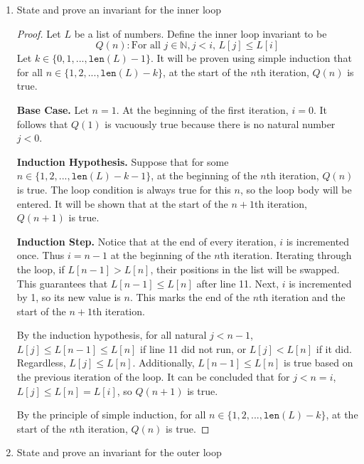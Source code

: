 \documentclass[11pt]{article}
\begin{document}
    \begin{enumerate}[label=(\alph*)]
        \item State and prove an invariant for the inner loop
        
        \begin{proof}
            Let \(L\) be a list of numbers. Define the inner loop invariant to be
            \[
                Q(n): \text{For all } j \in \mathbb{N}, j < i \text{, } L[j] \leq L[i]
            \]
            Let \(k \in \{0,1,..., \texttt{len}(L) - 1\}\). It will be proven using simple induction that for all \(n \in \{1, 2, ..., \texttt{len}(L) - k\}\), at the start of the \(n\)th iteration, \(Q(n)\) is true.

            \textbf{Base Case.} Let \(n=1\). At the beginning of the first iteration, \(i = 0\). It follows that \(Q(1)\) is vacuously true because there is no natural number \(j < 0\).

            \textbf{Induction Hypothesis.} Suppose that for some \(n \in \{1, 2,..., \texttt{len}(L)-k-1\}\), at the beginning of the \(n\)th iteration, \(Q(n)\) is true. The loop condition is always true for this \(n\), so the loop body will be entered. It will be shown that at the start of the \(n+1\)th iteration, \(Q(n+1)\) is true.

            \textbf{Induction Step.} Notice that at the end of every iteration, \(i\) is incremented once. Thus \(i = n - 1\) at the beginning of the \(n\)th iteration. Iterating through the loop, if \(L[n-1] > L[n]\), their positions in the list will be swapped. This guarantees that \(L[n-1] \leq L[n]\) after line 11. Next, \(i\) is incremented by 1, so its new value is \(n\). This marks the end of the \(n\)th iteration and the start of the \(n+1\)th iteration.

            By the induction hypothesis, for all natural \(j < n-1\), \(L[j] \leq L[n-1] \leq L[n]\) if line 11 did not run, or \(L[j] < L[n]\) if it did. Regardless, \(L[j] \leq L[n]\). Additionally, \(L[n-1] \leq L[n]\) is true based on the previous iteration of the loop. It can be concluded that for \(j < n = i\), \(L[j] \leq L[n] = L[i]\), so \(Q(n+1)\) is true.

            By the principle of simple induction, for all \(n \in \{1, 2, ..., \texttt{len}(L) - k\}\), at the start of the \(n\)th iteration, \(Q(n)\) is true.

        \end{proof}
        \item State and prove an invariant for the outer loop
        

\end{enumerate}
\end{document}
